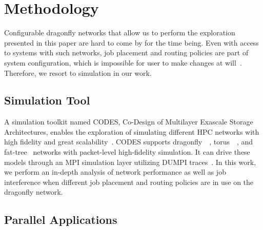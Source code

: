 

\section{Methodology}
\label{sec: methodology}

Configurable dragonfly networks that allow us to perform the exploration presented in this paper are hard to come by for the time being. Even with access to systems with such networks, job placement and routing policies are part of system configuration, which is impossible for user to make changes at will~\cite{zhou-ipdps-2015}\cite{jain-sc14}\cite{bhatele-sc11}\cite{jokanovic-ipdps-2015}. Therefore, we resort to simulation in our work.



\subsection{Simulation Tool}
\label{sec:simulation-tool}

A simulation toolkit named CODES, Co-Design of Multilayer Exascale Storage Architectures, enables the exploration of simulating different HPC networks with high fidelity and great scalability~\cite{codes}. CODES supports dragonfly~\cite{codes-dragonfly}~\cite{misbah-tpds}, torus~\cite{misbah-pads-2014}~\cite{ning-pads-2011}, and fat-tree~\cite{ning-pads-2015} networks with packet-level high-fidelity simulation. It can drive these models through an MPI simulation layer utilizing DUMPI traces~\cite{sst}. In this work, we perform an in-depth analysis of network performance as well as job interference when different job placement and routing policies are in use on the dragonfly network.

\subsection{Parallel Applications}
\label{sec: application traces}

